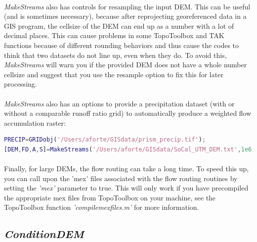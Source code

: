 \paragraph{}\textit{MakeStreams} also has controls for resampling the input DEM. This can be useful (and is sometimes necessary), because after reprojecting georeferenced data in a GIS program, the cellsize of the DEM can end up as a number with a lot of decimal places. This can cause problems in some TopoToolbox and TAK functions because of different rounding behaviors and thus cause the codes to think that two datasets do not line up, even when they do. To avoid this, \textit{MakeStreams} will warn you if the provided DEM does not have a whole number cellsize and suggest that you use the resample option to fix this for later processing. 

\paragraph{}\textit{MakeStreams} also has an options to provide a precipitation dataset (with or without a comparable runoff ratio grid) to automatically produce a weighted flow accumulation raster:

\begin{lstlisting}[language=Matlab]
PRECIP=GRIDobj('/Users/aforte/GISdata/prism_precip.tif');
[DEM,FD,A,S]=MakeStreams('/Users/aforte/GISdata/SoCal_UTM_DEM.txt',1e6,'precip_grid',PRECIP);
\end{lstlisting}

\paragraph{}Finally, for large DEMs, the flow routing can take a long time. To speed this up, you can call upon the 'mex' files associated with the flow routing routines by setting the \textit{'mex'} parameter to true. This will only work if you have precompiled the appropriate mex files from TopoToolbox on your machine, see the TopoToolbox function \textit{'compilemexfiles.m'} for more information.

\subsection{\textit{ConditionDEM}}

